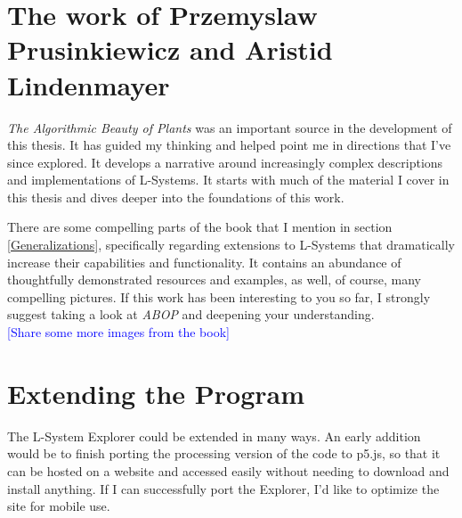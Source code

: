 \documentclass[12pt,twoside]{reedthesis}
\begin{document}
	
	


\section{The work of Przemyslaw Prusinkiewicz and Aristid Lindenmayer}
	
	\textit{The Algorithmic Beauty of Plants} was an important source in the development of this thesis. It has guided my thinking and helped point me in directions that I've since explored. It develops a narrative around increasingly complex descriptions and implementations of L-Systems. It starts with much of the material I cover in this thesis and dives deeper into the foundations of this work.
	
	There are some compelling parts of the book that I mention in section \ref{Generalizations}, specifically regarding extensions to L-Systems that dramatically increase their capabilities and functionality. It contains an abundance of thoughtfully demonstrated resources and examples, as well, of course, many compelling pictures. If this work has been interesting to you so far, I strongly suggest taking a look at \textit{ABOP} and deepening your understanding.\\
	
	\textcolor{blue}{[Share some more images from the book]}
	
\section{Extending the Program}
\label{Extensions}

	The L-System Explorer could be extended in many ways. An early addition would be to finish porting the processing version of the code to p5.js, so that it can be hosted on a website and accessed easily without needing to download and install anything. If I can successfully port the Explorer, I'd like to optimize the site for mobile use.
	
\end{document}

